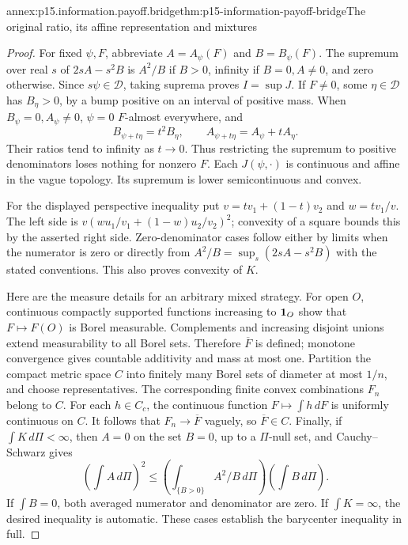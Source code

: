 \begin{annexitem}{annex:p15.information.payoff.bridge}{thm:p15-information-payoff-bridge}{The original ratio, its affine representation and mixtures}
\begin{proof}
For fixed \(\psi,F\), abbreviate \(A=A_\psi(F)\) and \(B=B_\psi(F)\).
The supremum over real \(s\) of \(2sA-s^2B\) is \(A^2/B\) if \(B>0\),
infinity if \(B=0,A\ne0\), and zero otherwise. Since \(s\psi\in\mathcal D\),
taking suprema proves \(I=\sup J\). If \(F\ne0\), some
\(\eta\in\mathcal D\) has \(B_\eta>0\), by a bump positive on an interval
of positive mass. When \(B_\psi=0,A_\psi\ne0\), \(\psi=0\) \(F\)-almost
everywhere, and
\[
 B_{\psi+t\eta}=t^2B_\eta,\qquad
 A_{\psi+t\eta}=A_\psi+tA_\eta .
\]
Their ratios tend to infinity as \(t\to0\). Thus restricting the
supremum to positive denominators loses nothing for nonzero \(F\).
Each \(J(\psi,\cdot)\) is continuous and affine in the vague topology.
Its supremum is lower semicontinuous and convex.

For the displayed perspective inequality put
\(v=tv_1+(1-t)v_2\) and \(w=tv_1/v\).
The left side is
\(v(wu_1/v_1+(1-w)u_2/v_2)^2\); convexity of a square bounds this
by the asserted right side. Zero-denominator cases follow either
by limits when the numerator is zero or directly from
\(A^2/B=\sup_s(2sA-s^2B)\) with the stated conventions.
This also proves convexity of \(K\).

Here are the measure details for an arbitrary mixed strategy.
For open \(O\), continuous compactly supported functions increasing
to \({\bf1}_O\) show that \(F\mapsto F(O)\) is Borel measurable.
Complements and increasing disjoint unions extend measurability to
all Borel sets. Therefore \(\overline F\) is defined; monotone
convergence gives countable additivity and mass at most one.
Partition the compact metric space \(C\) into finitely many Borel
sets of diameter at most \(1/n\), and choose representatives.
The corresponding finite convex combinations \(F_n\) belong to \(C\).
For each \(h\in C_c\), the continuous function
\(F\mapsto\int h\,dF\) is uniformly continuous on \(C\).
It follows that \(F_n\to\overline F\) vaguely, so \(\overline F\in C\).
Finally, if \(\int K\,d\Pi<\infty\), then \(A=0\) on the set \(B=0\),
up to a \(\Pi\)-null set, and Cauchy--Schwarz gives
\[
 \left(\int A\,d\Pi\right)^2
 \leq \left(\int_{\{B>0\}}A^2/B\,d\Pi\right)\left(\int B\,d\Pi\right).
\]
If \(\int B=0\), both averaged numerator and denominator are zero.
If \(\int K=\infty\), the desired inequality is automatic.
These cases establish the barycenter inequality in full.
\end{proof}
\end{annexitem}

